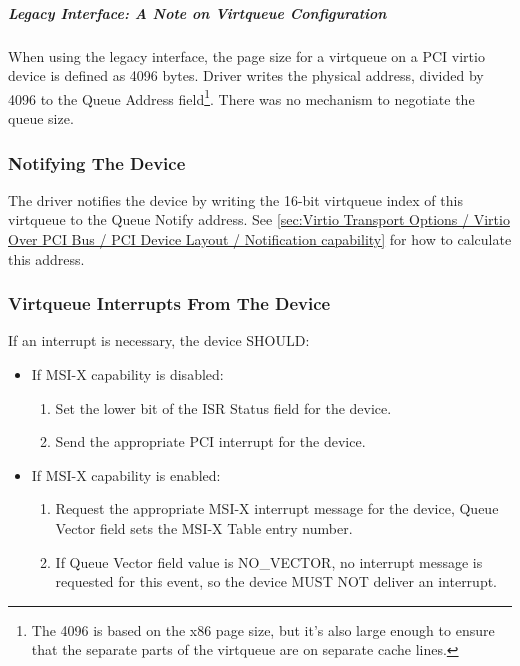 \subparagraph{Legacy Interface: A Note on Virtqueue Configuration}\label{sec:Virtio Transport Options / Virtio Over PCI Bus / PCI-specific Initialization And Device Operation / Device Initialization / Virtqueue Configuration / Legacy Interface: A Note on Virtqueue Configuration}
When using the legacy interface, the page size for a virtqueue on a PCI virtio
device is defined as 4096 bytes.  Driver writes the physical address, divided
by 4096 to the Queue Address field\footnote{The 4096 is based on the x86 page size, but it's also large
enough to ensure that the separate parts of the virtqueue are on
separate cache lines.
}.  There was no mechanism to negotiate the queue size.

\subsubsection{Notifying The Device}\label{sec:Virtio Transport Options / Virtio Over PCI Bus / PCI-specific Initialization And Device Operation / Notifying The Device}

The driver notifies the device by writing the 16-bit virtqueue index
of this virtqueue to the Queue Notify address.  See \ref{sec:Virtio Transport Options / Virtio Over PCI Bus / PCI Device Layout / Notification capability} for how to calculate this address.

\subsubsection{Virtqueue Interrupts From The Device}\label{sec:Virtio Transport Options / Virtio Over PCI Bus / PCI-specific Initialization And Device Operation / Virtqueue Interrupts From The Device}

If an interrupt is necessary, the device SHOULD:

\begin{itemize}
  \item If MSI-X capability is disabled:
    \begin{enumerate}
    \item Set the lower bit of the ISR Status field for the device.

    \item Send the appropriate PCI interrupt for the device.
    \end{enumerate}

  \item If MSI-X capability is enabled:
    \begin{enumerate}
    \item Request the appropriate MSI-X interrupt message for the
      device, Queue Vector field sets the MSI-X Table entry
      number.

    \item If Queue Vector field value is NO_VECTOR, no interrupt
      message is requested for this event, so the device MUST NOT
      deliver an interrupt.
    \end{enumerate}
\end{itemize}

